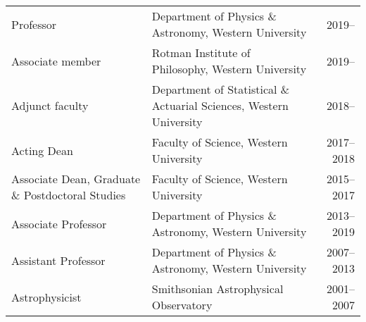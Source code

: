 
\begin{tabularx}{\textwidth}{p{5cm}Xr}
Professor & Department of Physics \& Astronomy, Western University & 2019--\\
Associate member & Rotman Institute of Philosophy, Western University & 2019--\\
Adjunct faculty & Department of Statistical \& Actuarial Sciences, Western University & 2018--\\
Acting Dean & Faculty of Science, Western University & 2017--2018 \\
Associate Dean, Graduate \& Postdoctoral Studies & Faculty of Science, Western University & 2015--2017 \\
Associate Professor & Department of Physics \& Astronomy, Western University & 2013--2019\\
Assistant Professor& Department of Physics \& Astronomy, Western University&2007--2013  \\
 Astrophysicist & Smithsonian Astrophysical Observatory & 2001--2007\\
\end{tabularx}

